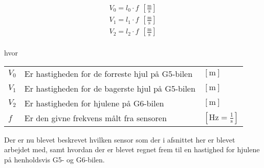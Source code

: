 \documentclass[12pt,a4paper]{report}
\begin{document}
\begin{center}
	\begin{subequations} \label{eq:fart}
		\begin{align}
V_{0} = l_{0} \cdot f ~~ \left[\frac{\text{m}}{\text{s}}\right] \\
V_{1} = l_{1} \cdot f ~~ \left[\frac{\text{m}}{\text{s}}\right] \\
V_{2} = l_{2} \cdot f ~~ \left[\frac{\text{m}}{\text{s}}\right] \\
		\end{align}	
	\end{subequations}
\end{center}
hvor
\begin{center}
	\begin{tabular}{ l l l }
	  $V_{0}$ & Er hastigheden for de forreste hjul på G5-bilen & $\left[\text{m}\right]$ \\
	  $V_{1}$ & Er hastigheden for de bagerste hjul på G5-bilen & $\left[\text{m}\right]$\\
	  $V_{2}$ & Er hastigheden for hjulene på G6-bilen & $\left[\text{m}\right]$ \\
	  $f$ & Er den givne frekvens målt fra sensoren & $\left[\text{Hz} = \frac{1}{\text{s}}\right]$ \\
	\end{tabular}  
\end{center}

Der er nu blevet beskrevet hvilken sensor som der i afsnittet her er blevet arbejdet med, samt hvordan der er blevet regnet frem til en hastighed for hjulene på henholdsvis G5- og G6-bilen.
\end{document}

